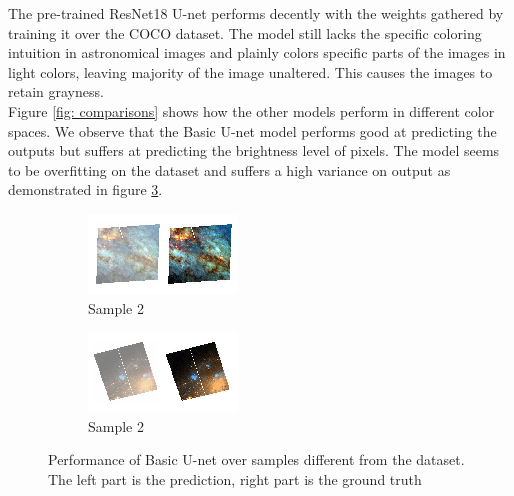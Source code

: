 \documentclass{article} %
\begin{document}
    \hspace*{0.167 in}The pre-trained ResNet18 U-net performs decently with the weights gathered by training it over the COCO dataset. The model still lacks the specific coloring intuition in astronomical images and plainly colors specific parts of the images in light colors, leaving majority of the image unaltered. This causes the images to retain grayness.  \\  
    \hspace*{0.167 in}Figure \ref{fig: comparisons} shows how the other models perform in different color spaces. We observe that the Basic U-net model performs good at predicting the outputs but suffers at predicting the brightness level of pixels. The model seems to be overfitting on the dataset and suffers a high variance on output as demonstrated in figure \ref{fig: u-net_overfit}.
    \begin{figure}[!htb]
    	\centering
    	\begin{subfigure}[b]{0.35\textwidth}
    		\centering
    		\includegraphics[width=\textwidth]{figures/overfit_1}
    		\caption{Sample 2}
    		\label{fig: overfit1}
    	\end{subfigure}
    		\hspace{0.1 in}
    	\begin{subfigure}[b]{0.35\textwidth}
    		\centering
    		\includegraphics[width=\textwidth]{figures/overfit_2}
    		\caption{Sample 2}
    		\label{fig: overfit2}
    	\end{subfigure}
    	\caption{Performance of Basic U-net over samples different from the dataset. The left part is the prediction, right part is the ground truth}
    	\label{fig: u-net_overfit}
    \end{figure}
    
\end{document}
